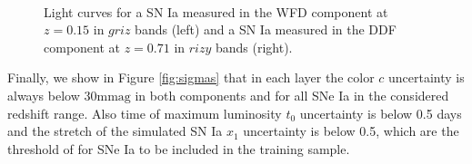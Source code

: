 \documentclass[\docopts]{\docclass}
\begin{document}
\begin{figure}[t]
\begin{center}
\\
\caption{Light curves for a SN Ia measured in the WFD component at $z=0.15$ in $griz$ bands (left) and a SN Ia measured in the DDF component at $z=0.71$ in $rizy$ bands (right).}
\label{fig:lc_examples}
\end{center}
\end{figure}

Finally, we show in Figure \ref{fig:sigmas} that in each layer the  color $c$ uncertainty is always below 30$\mathrm{mmag}$ in both components and for all SNe Ia in the considered redshift range.
Also time of maximum luminosity $t_0$ uncertainty is below 0.5 days and the stretch of the simulated SN Ia $x_1$ uncertainty is below 0.5, which are the threshold of \cite{1401.4064} for SNe Ia to be included in the training sample.
\end{document}
